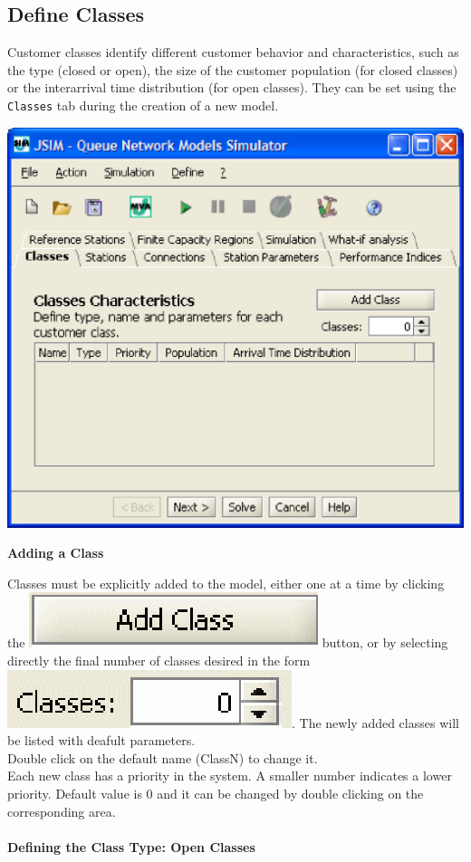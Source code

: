 \subsection{Define Classes}
\label{sec:DefineClasses}
Customer classes identify different customer behavior and
characteristics, such as the type (closed or open), the size of the customer population (for closed classes) or the interarrival time distribution (for open classes).
They can be set using the \texttt{Classes} tab during the creation of a new model.\\
\begin{center}
\includegraphics[scale=.5]{img/jsim/define_class1}
\end{center}

\noindent\textbf{{Adding a Class}}

Classes must be explicitly added to the model, either one at a time by clicking the \includegraphics[scale=.5]{img/jsim/button_addClass.eps} button, or by selecting directly the final number of classes desired in the form \includegraphics[scale=.5]{img/jsim/button_NClass.eps}. The newly added classes will be listed with deafult parameters.\\
Double click on the default name (ClassN) to change it.\\
Each new class has a priority in the system. A smaller number indicates a lower priority. Default value is 0 and it can be changed by double clicking on the corresponding area.\\\\
\textbf{{Defining the Class Type: Open Classes}}

